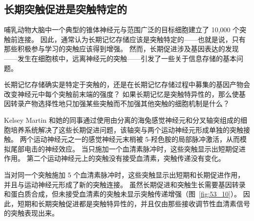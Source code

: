 \subsection{长期突触促进是突触特定的}

哺乳动物大脑中一个典型的锥体神经元与范围广泛的目标细胞建立了 10,000 个突触前连接。
因此，通常认为长期记忆存储应该是突触特定的——也就是说，只有那些积极参与学习的突触应该得到增强。
然而，长期促进涉及基因表达的发现——发生在细胞核中，远离神经元的突触——引发了一些关于信息存储的基本问题。


长期记忆存储确实是特定于突触的，还是在长期记忆存储过程中募集的基因产物会改变神经元中每个突触前末端的强度？
如果长期记忆是突触特异性的，那么使基因转录产物选择性地只加强某些突触而不加强其他突触的细胞机制是什么？


Kelsey Martin 和她的同事通过使用由分离的海兔感觉神经元和分叉轴突组成的细胞培养系统解决了这些长期促进问题，该轴突与两个运动神经元形成单独的突触接触。
两个运动神经元之一的感觉神经元末梢被 5-羟色胺的局部脉冲激活，从而模拟尾部电击的神经效应。
当只施加一个血清素脉冲时，这些突触显示出短期促进作用。
第二个运动神经元上的突触没有接受血清素，突触传递没有变化。


当对同一个突触施加 5 个血清素脉冲时，这些突触显示出短期和长期促进作用，并且与运动神经元形成了新的突触连接。
虽然长期促进和突触生长需要基因转录和蛋白质合成，但未接受血清素的突触未显示突触传递增强（图~\ref{fig:53_10}）。
因此，短期和长期突触促进都是突触特异性的，并且仅由那些接收调节性血清素信号的突触表现出来。


